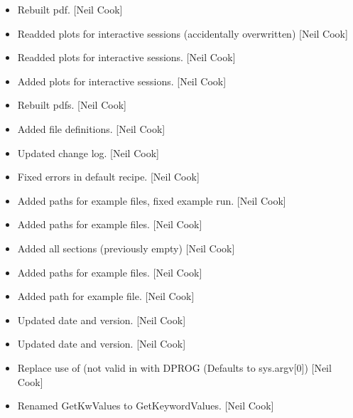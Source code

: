 \documentclass[a4paper,10pt,english]{report}
\begin{document}
\begin{itemize}
\item {} 
Rebuilt pdf. {[}Neil Cook{]}

\item {} 
Readded  plots for interactive sessions (accidentally
overwritten) {[}Neil Cook{]}

\item {} 
Readded  plots for interactive sessions. {[}Neil Cook{]}

\item {} 
Added  plots for interactive sessions. {[}Neil Cook{]}

\item {} 
Rebuilt pdfs. {[}Neil Cook{]}

\item {} 
Added  file definitions. {[}Neil Cook{]}

\item {} 
Updated  change log. {[}Neil Cook{]}

\item {} 
Fixed errors in default recipe. {[}Neil Cook{]}

\item {} 
Added paths for example files, fixed example run. {[}Neil Cook{]}

\item {} 
Added paths for example files. {[}Neil Cook{]}

\item {} 
Added all sections (previously empty) {[}Neil Cook{]}

\item {} 
Added paths for example files. {[}Neil Cook{]}

\item {} 
Added path for example file. {[}Neil Cook{]}

\item {} 
Updated date and version. {[}Neil Cook{]}

\item {} 
Updated date and version. {[}Neil Cook{]}

\item {} 
Replace use of  (not valid in  with DPROG
(Defaults to sys.argv{[}0{]}) {[}Neil Cook{]}

\item {} 
Renamed GetKwValues to GetKeywordValues. {[}Neil Cook{]}


\end{itemize}
\end{document}
